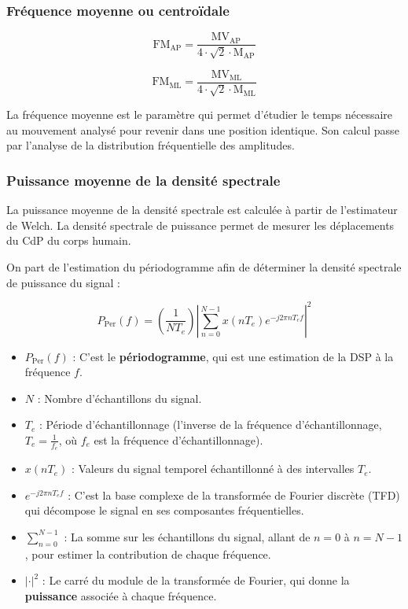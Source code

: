 \subsubsection{Fréquence moyenne ou centroïdale}

\[
\text{FM}_{\text{AP}} = \frac{\text{MV}_{\text{AP}}}{4 \cdot \sqrt{2} \cdot \text{M}_{\text{AP}}} \tag{15}
\]

\[
\text{FM}_{\text{ML}} = \frac{\text{MV}_{\text{ML}}}{4 \cdot \sqrt{2} \cdot \text{M}_{\text{ML}}} \tag{16}
\]

La fréquence moyenne est le paramètre qui permet d'étudier le temps nécessaire au mouvement analysé pour revenir dans une position identique. 
Son calcul passe par l'analyse de la distribution fréquentielle des amplitudes.

\subsubsection{Puissance moyenne de la densité spectrale}

La puissance moyenne de la densité spectrale est calculée à partir de l'estimateur de Welch. 
La densité spectrale de puissance permet de mesurer les déplacements du CdP du corps humain.

On part de l'estimation du périodogramme afin de déterminer la densité spectrale de puissance du signal : 

\[
P_{\text{Per}}(f) = \left( \frac{1}{N T_e} \right) \left| \sum_{n=0}^{N-1} x(nT_e)e^{-j2\pi n T_e f} \right|^2
\]

\begin{itemize}
    \item $P_{\text{Per}}(f)$ : C'est le \textbf{périodogramme}, qui est une estimation de la DSP à la fréquence $f$.
    \item $N$ : Nombre d'échantillons du signal.
    \item $T_e$ : Période d'échantillonnage (l'inverse de la fréquence d'échantillonnage, $T_e = \frac{1}{f_e}$, où $f_e$ est la fréquence d'échantillonnage).
    \item $x(nT_e)$ : Valeurs du signal temporel échantillonné à des intervalles $T_e$.
    \item $e^{-j2\pi n T_e f}$ : C'est la base complexe de la transformée de Fourier discrète (TFD) qui décompose le signal en ses composantes fréquentielles.
    \item $\sum_{n=0}^{N-1}$ : La somme sur les échantillons du signal, allant de $n=0$ à $n=N-1$, pour estimer la contribution de chaque fréquence.
    \item $\left| \cdot \right|^2$ : Le carré du module de la transformée de Fourier, qui donne la \textbf{puissance} associée à chaque fréquence.
\end{itemize}


